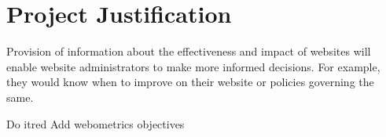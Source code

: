 \section{Project Justification}
\noindent
Provision of information about the effectiveness and impact of websites will enable website administrators to make more informed decisions. For example, they would know when to improve on their website or policies governing the same.
\begin{review_comment}{Do it}{red}
{Add webometrics objectives}
\end{review_comment}


